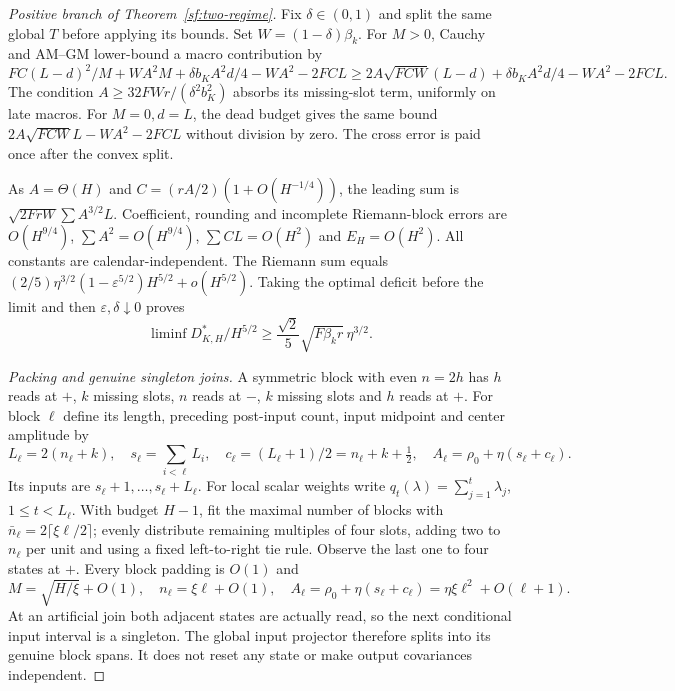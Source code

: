 \documentclass[journal]{IEEEtran}
\begin{document}
\begin{proof}[Positive branch of Theorem~\ref{sf:two-regime}]
Fix $\delta\in(0,1)$ and split the same global $T$ before applying its bounds.
Set $W=(1-\delta)\beta_k$.
For $M>0$, Cauchy and AM--GM lower-bound a macro contribution by
\[
FC(L-d)^2/M+WA^2M+\delta b_KA^2d/4-WA^2-2FCL
\ge2A\sqrt{FCW}(L-d)+\delta b_KA^2d/4-WA^2-2FCL.
\]
The condition $A\ge32FWr/(\delta^2b_K^2)$ absorbs its missing-slot term,
uniformly on late macros. For $M=0,d=L$, the dead budget gives the same
bound $2A\sqrt{FCW}L-WA^2-2FCL$ without division by zero.
The cross error is paid once after the convex split.

As $A=\Theta(H)$ and $C=(rA/2)(1+O(H^{-1/4}))$, the leading sum is
$\sqrt{2FrW}\sum A^{3/2}L$.
Coefficient, rounding and incomplete Riemann-block errors are $O(H^{9/4})$,
$\sum A^2=O(H^{9/4})$, $\sum CL=O(H^2)$ and $E_H=O(H^2)$.
All constants are calendar-independent.
The Riemann sum equals
$(2/5)\eta^{3/2}(1-\varepsilon^{5/2})H^{5/2}+o(H^{5/2})$.
Taking the optimal deficit before the limit and then
$\varepsilon,\delta\downarrow0$ proves
\begin{equation}\label{sf:lower}
\liminf D_{K,H}^*/H^{5/2}\ge
\frac{\sqrt2}{5}\sqrt{F\beta_k r}\,\eta^{3/2}.
\end{equation}

\par\smallskip\noindent\textit{Packing and genuine singleton joins.}\enspace 
A symmetric block with even $n=2h$ has $h$ reads at $+$, $k$ missing slots,
$n$ reads at $-$, $k$ missing slots and $h$ reads at $+$.
For block $\ell$ define its length, preceding post-input count,
input midpoint and center amplitude by
\begin{equation}\label{sf:block}
L_\ell=2(n_\ell+k),\quad s_\ell=\sum_{i<\ell}L_i,\quad
c_\ell=(L_\ell+1)/2=n_\ell+k+\tfrac12,\quad
A_\ell=\rho_0+\eta(s_\ell+c_\ell).
\end{equation}
Its inputs are $s_\ell+1,\ldots,s_\ell+L_\ell$. For local scalar weights
write $q_t(\lambda)=\sum_{j=1}^t\lambda_j$, $1\le t<L_\ell$.
With budget $H-1$, fit the maximal number of blocks with
$\bar n_\ell=2\lceil\xi\ell/2\rceil$; evenly distribute remaining multiples of
four slots, adding two to $n_\ell$ per unit and using a fixed left-to-right
tie rule. Observe the last one to four states at $+$.
Every block padding is $O(1)$ and
\[
M=\sqrt{H/\xi}+O(1),\quad n_\ell=\xi\ell+O(1),\quad
A_\ell=\rho_0+\eta(s_\ell+c_\ell)=\eta\xi\ell^2+O(\ell+1).
\]
At an artificial join both adjacent states are actually read, so the next
conditional input interval is a singleton.
The global input projector therefore splits into its genuine block spans.
It does not reset any state or make output covariances independent.


\end{proof}
\end{document}
